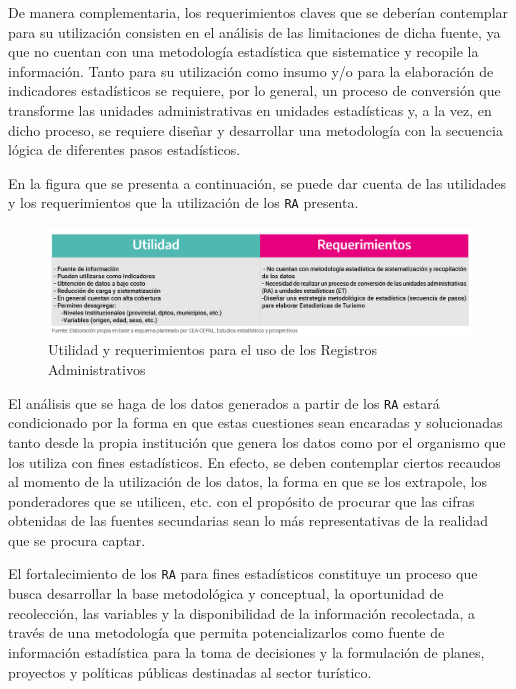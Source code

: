 \documentclass[
]{book}
\begin{document}
De manera complementaria, los requerimientos claves que se deberían contemplar para su utilización consisten en el análisis de las limitaciones de dicha fuente, ya que no cuentan con una metodología estadística que sistematice y recopile la información. Tanto para su utilización como insumo y/o para la elaboración de indicadores estadísticos se requiere, por lo general, un proceso de conversión que transforme las unidades administrativas en unidades estadísticas y, a la vez, en dicho proceso, se requiere diseñar y desarrollar una metodología con la secuencia lógica de diferentes pasos estadísticos.

En la figura que se presenta a continuación, se puede dar cuenta de las utilidades y los requerimientos que la utilización de los \texttt{RA} presenta.

\begin{figure}

{\centering \includegraphics[width=0.8\linewidth]{imagenes/figura01} 

}

\caption{Utilidad y requerimientos para el uso de los Registros Administrativos}\label{fig:registrosadministrativos}
\end{figure}

El análisis que se haga de los datos generados a partir de los \texttt{RA} estará condicionado por la forma en que estas cuestiones sean encaradas y solucionadas tanto desde la propia institución que genera los datos como por el organismo que los utiliza con fines estadísticos. En efecto, se deben contemplar ciertos recaudos al momento de la utilización de los datos, la forma en que se los extrapole, los ponderadores que se utilicen, etc. con el propósito de procurar que las cifras obtenidas de las fuentes secundarias sean lo más representativas de la realidad que se procura captar.

El fortalecimiento de los \texttt{RA} para fines estadísticos constituye un proceso que busca desarrollar la base metodológica y conceptual, la oportunidad de recolección, las variables y la disponibilidad de la información recolectada, a través de una metodología que permita potencializarlos como fuente de información estadística para la toma de decisiones y la formulación de planes, proyectos y políticas públicas destinadas al sector turístico.
\end{document}
